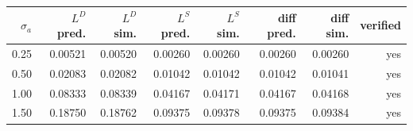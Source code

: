 \begin{tabular}{rrrrrrrr}
\toprule
$\sigma_a$ & $L^D$ pred. & $L^D$ sim. & $L^S$ pred. & $L^S$ sim. & diff pred. & diff sim. & verified \\
\midrule
0.25 & 0.00521 & 0.00520 & 0.00260 & 0.00260 & 0.00260 & 0.00260 & yes \\
0.50 & 0.02083 & 0.02082 & 0.01042 & 0.01042 & 0.01042 & 0.01041 & yes \\
1.00 & 0.08333 & 0.08339 & 0.04167 & 0.04171 & 0.04167 & 0.04168 & yes \\
1.50 & 0.18750 & 0.18762 & 0.09375 & 0.09378 & 0.09375 & 0.09384 & yes \\
\bottomrule
\end{tabular}
